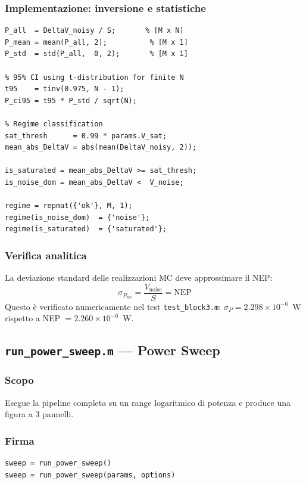 \documentclass[11pt,a4paper]{article}
\begin{document}
\subsubsection*{Implementazione: inversione e statistiche}

\begin{lstlisting}[caption={reconstruct\_power.m --- inversione e classificazione}]
% Core inversion: P_rec = DeltaV / S
P_all  = DeltaV_noisy / S;       % [M x N]
P_mean = mean(P_all, 2);          % [M x 1]
P_std  = std(P_all,  0, 2);       % [M x 1]

% 95% CI using t-distribution for finite N
t95    = tinv(0.975, N - 1);
P_ci95 = t95 * P_std / sqrt(N);

% Regime classification
sat_thresh      = 0.99 * params.V_sat;
mean_abs_DeltaV = abs(mean(DeltaV_noisy, 2));

is_saturated = mean_abs_DeltaV >= sat_thresh;
is_noise_dom = mean_abs_DeltaV <  V_noise;

regime = repmat({'ok'}, M, 1);
regime(is_noise_dom)  = {'noise'};
regime(is_saturated)  = {'saturated'};
\end{lstlisting}

\subsubsection*{Verifica analitica}

La deviazione standard delle realizzazioni MC deve approssimare il NEP:
\begin{equation}
  \sigma_{P_{\text{rec}}} = \frac{V_{\text{noise}}}{S} = \text{NEP}
\end{equation}
Questo è verificato numericamente nel test \texttt{test\_block3.m}:
$\sigma_P = 2.298 \times 10^{-6}$~W rispetto a NEP $= 2.260 \times 10^{-6}$~W.

\subsection{\texttt{run\_power\_sweep.m} --- Power Sweep}

\subsubsection*{Scopo}
Esegue la pipeline completa su un range logaritmico di potenza
e produce una figura a 3 pannelli.

\subsubsection*{Firma}
\begin{lstlisting}
sweep = run_power_sweep()
sweep = run_power_sweep(params, options)
\end{lstlisting}
\end{document}
